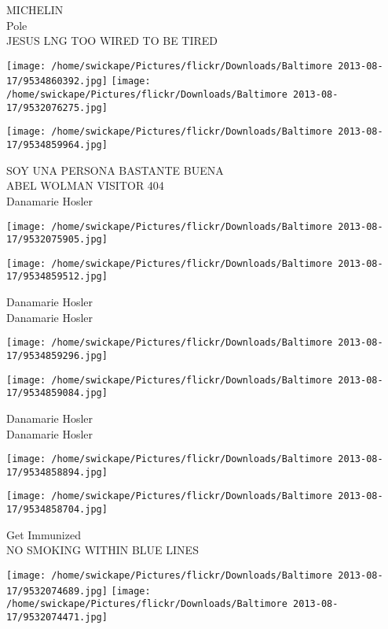 \documentclass[10pt,letterpaper]{article}
\begin{document}
MICHELIN\\
Pole\\
JESUS LNG TOO WIRED TO BE TIRED\\
\pagebreak

\texttt{[image: /home/swickape/Pictures/flickr/Downloads/Baltimore 2013-08-17/9534860392.jpg]}
\texttt{[image: /home/swickape/Pictures/flickr/Downloads/Baltimore 2013-08-17/9532076275.jpg]}

\vspace{0.25in}
\texttt{[image: /home/swickape/Pictures/flickr/Downloads/Baltimore 2013-08-17/9534859964.jpg]}

SOY UNA PERSONA BASTANTE BUENA\\
ABEL WOLMAN VISITOR 404\\
Danamarie Hosler\\
\pagebreak

\texttt{[image: /home/swickape/Pictures/flickr/Downloads/Baltimore 2013-08-17/9532075905.jpg]}

\vspace{0.25in}
\texttt{[image: /home/swickape/Pictures/flickr/Downloads/Baltimore 2013-08-17/9534859512.jpg]}

Danamarie Hosler\\
Danamarie Hosler\\
\pagebreak

\texttt{[image: /home/swickape/Pictures/flickr/Downloads/Baltimore 2013-08-17/9534859296.jpg]}

\vspace{0.25in}
\texttt{[image: /home/swickape/Pictures/flickr/Downloads/Baltimore 2013-08-17/9534859084.jpg]}

Danamarie Hosler\\
Danamarie Hosler\\
\pagebreak

\texttt{[image: /home/swickape/Pictures/flickr/Downloads/Baltimore 2013-08-17/9534858894.jpg]}

\vspace{0.25in}
\texttt{[image: /home/swickape/Pictures/flickr/Downloads/Baltimore 2013-08-17/9534858704.jpg]}

Get Immunized\\
NO SMOKING WITHIN BLUE LINES\\
\pagebreak

\texttt{[image: /home/swickape/Pictures/flickr/Downloads/Baltimore 2013-08-17/9532074689.jpg]}
\texttt{[image: /home/swickape/Pictures/flickr/Downloads/Baltimore 2013-08-17/9532074471.jpg]}
\end{document}
